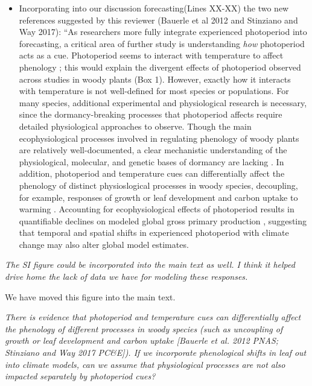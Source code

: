 \documentclass{article}
\begin{document}
\begin{itemize}
\item Incorporating into our discussion forecasting(Lines XX-XX) the two new references suggested by this reviewer (Bauerle et al 2012 and Stinziano and Way 2017): ``As researchers more fully integrate experienced photoperiod into forecasting, a critical area of further study is understanding \emph{how} photoperiod acts as a cue. Photoperiod seems to interact with temperature to affect phenology \citep[e.g., Box 1,][]{zydlewski2014}; this would explain the divergent effects of photoperiod observed across studies in woody plants (Box 1). However, exactly how it interacts with temperature is not well-defined for most species or populations. For many species, additional experimental and physiological research is necessary, since the dormancy-breaking processes that photoperiod affects require detailed physiological approaches to observe. Though the main ecophysiological processes involved in regulating phenology of woody plants are relatively well-documented, a clear mechanistic understanding of the physiological, molecular, and genetic bases of dormancy are lacking \citep[Box 2][]{hanninen2019, chuine2016}. In addition, photoperiod and temperature cues can differentially affect the phenology of distinct physioslogical processes in woody species, decoupling, for example, responses of growth or leaf development and carbon uptake to warming \citep{bauerle2012,stinziano2017}. Accounting for ecophysiological effects of photoperiod results in quantifiable declines on modeled global gross primary production \citep{bauerle2012}, suggesting that temporal and spatial shifts in experienced photoperiod with climate change may also alter global model estimates.

\end{itemize}
\par \emph{The SI figure could be incorporated into the main text as well. I think it helped drive home the lack of data we have for modeling these responses.}

\par We have moved this figure into the main text.

\par \emph{There is evidence that photoperiod and temperature cues can differentially affect the phenology of different processes in woody species (such as uncoupling of growth or leaf development and carbon uptake [Bauerle et al. 2012 PNAS; Stinziano and Way 2017 PC\&E]). If we incorporate phenological shifts in leaf out into climate models, can we assume that physiological processes are not also impacted separately by photoperiod cues?} 
\end{document}
